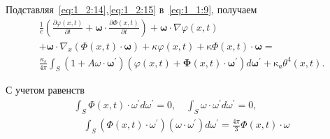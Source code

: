 
Подставляя~\eqref{eq:1_2:14},\eqref{eq:1_2:15} в~\eqref{eq:1_1:9}, получаем
\begin{gather*}
    \frac{1}{c}\left(\frac{\partial \varphi(x, t)}{\partial t}
    + \boldsymbol{\omega} \cdot \frac{\partial \Phi(x, t)}{\partial t}\right)
    + \boldsymbol{\omega} \cdot \nabla \varphi(x, t) \\
    + \boldsymbol{\omega} \cdot \nabla_{x}(\Phi(x, t) \cdot \boldsymbol{\omega})
    + \kappa \varphi(x, t)
    + \mathrm{\kappa} \Phi(x, t) \cdot \boldsymbol{\omega}= \\
    \frac{\kappa_{s}}{4 \pi} \int_{S}\left(1+A \omega \cdot
    \boldsymbol{\omega}^{\prime}\right)\left(\varphi(x, t)+\boldsymbol{\Phi}(x, t)
    \cdot \boldsymbol{\omega}^{\prime}\right) d \boldsymbol{\omega}^{\prime}
    + \mathrm{\kappa}_{a} \theta^{4}(x, t).
\end{gather*}

С учетом равенств
\begin{gather*}
    \int_{S} \Phi(x, t) \cdot \omega^{\prime} d \omega^{\prime} = 0,
    \quad \int_{S} \omega \cdot \omega^{\prime} d \omega^{\prime} = 0, \\
    \quad \int_{S}\left(\Phi(x, t) \cdot \omega^{\prime}\right)\left(\omega \cdot
    \omega^{\prime}\right) d \omega^{\prime}=\frac{4 \pi}{3} \Phi(x, t) \cdot \omega
\end{gather*}

